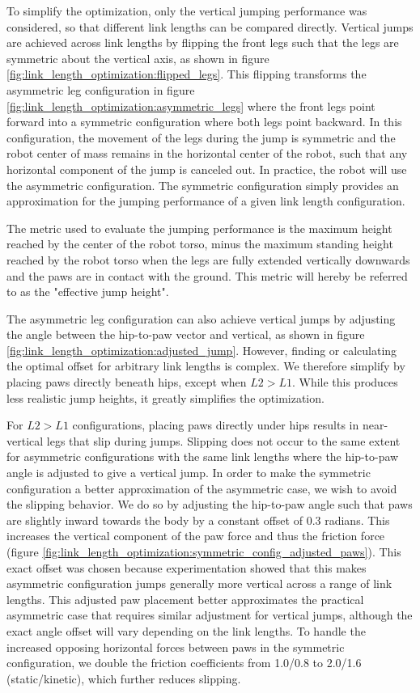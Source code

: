 To simplify the optimization, only the vertical jumping performance was considered, so that different link lengths can be compared directly. Vertical jumps are achieved across link lengths by flipping the front legs such that the legs are symmetric about the vertical axis, as shown in figure \ref{fig:link_length_optimization:flipped_legs}. This flipping transforms the asymmetric leg configuration in figure \ref{fig:link_length_optimization:asymmetric_legs} where the front legs point forward into a symmetric configuration where both legs point backward. In this configuration, the movement of the legs during the jump is symmetric and the robot center of mass remains in the horizontal center of the robot, such that any horizontal component of the jump is canceled out. In practice, the robot will use the asymmetric configuration. The symmetric configuration simply provides an approximation for the jumping performance of a given link length configuration.

The metric used to evaluate the jumping performance is the maximum height reached by the center of the robot torso, minus the maximum standing height reached by the robot torso when the legs are fully extended vertically downwards and the paws are in contact with the ground. This metric will hereby be referred to as the "effective jump height".

The asymmetric leg configuration can also achieve vertical jumps by adjusting the angle between the hip-to-paw vector and vertical, as shown in figure \ref{fig:link_length_optimization:adjusted_jump}. However, finding or calculating the optimal offset for arbitrary link lengths is complex. We therefore simplify by placing paws directly beneath hips, except when $L2>L1$. While this produces less realistic jump heights, it greatly simplifies the optimization.

For $L2>L1$ configurations, placing paws directly under hips results in near-vertical legs that slip during jumps. Slipping does not occur to the same extent for asymmetric configurations with the same link lengths where the hip-to-paw angle is adjusted to give a vertical jump. In order to make the symmetric configuration a better approximation of the asymmetric case, we wish to avoid the slipping behavior. We do so by adjusting the hip-to-paw angle such that paws are slightly inward towards the body by a constant offset of 0.3 radians. This increases the vertical component of the paw force and thus the friction force (figure \ref{fig:link_length_optimization:symmetric_config_adjusted_paws}). This exact offset was chosen because experimentation showed that this makes asymmetric configuration jumps generally more vertical across a range of link lengths. This adjusted paw placement better approximates the practical asymmetric case that requires similar adjustment for vertical jumps, although the exact angle offset will vary depending on the link lengths. To handle the increased opposing horizontal forces between paws in the symmetric configuration, we double the friction coefficients from 1.0/0.8 to 2.0/1.6 (static/kinetic), which further reduces slipping.


